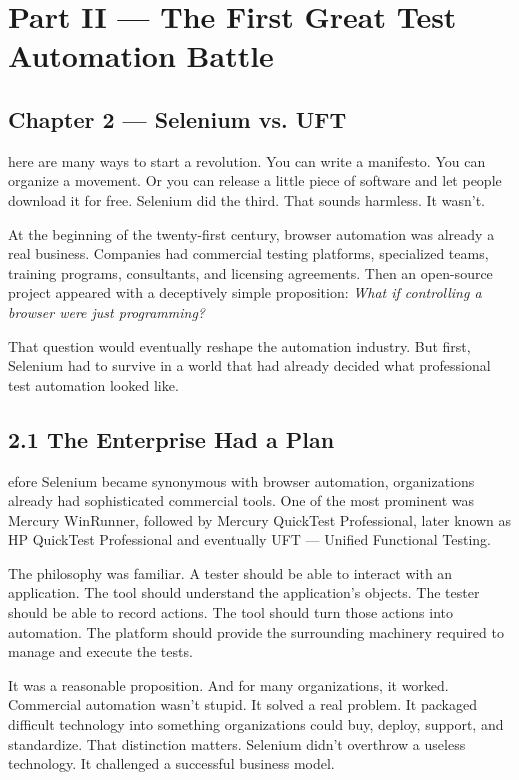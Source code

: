 \documentclass[11pt, a4paper, openany]{book}
\newcommand{\initialcap}[1]{{\fontfamily{lmss}\selectfont\huge\textbf{#1}}}
\begin{document}
\mainmatter

\chapter*{Part II --- The First Great Test Automation Battle}

\section*{Chapter 2 --- Selenium vs. UFT}

\noindent \initialcap{T}here are many ways to start a revolution. You can write a manifesto. You can organize a movement. Or you can release a little piece of software and let people download it for free. Selenium did the third. That sounds harmless. It wasn't.

At the beginning of the twenty-first century, browser automation was already a real business. Companies had commercial testing platforms, specialized teams, training programs, consultants, and licensing agreements. Then an open-source project appeared with a deceptively simple proposition: \textit{What if controlling a browser were just programming?}

That question would eventually reshape the automation industry. But first, Selenium had to survive in a world that had already decided what professional test automation looked like.

\section{2.1 The Enterprise Had a Plan}
\noindent \initialcap{B}efore Selenium became synonymous with browser automation, organizations already had sophisticated commercial tools. One of the most prominent was Mercury WinRunner, followed by Mercury QuickTest Professional, later known as HP QuickTest Professional and eventually UFT --- Unified Functional Testing.

The philosophy was familiar. A tester should be able to interact with an application. The tool should understand the application's objects. The tester should be able to record actions. The tool should turn those actions into automation. The platform should provide the surrounding machinery required to manage and execute the tests.

It was a reasonable proposition. And for many organizations, it worked. Commercial automation wasn't stupid. It solved a real problem. It packaged difficult technology into something organizations could buy, deploy, support, and standardize. That distinction matters. Selenium didn't overthrow a useless technology. It challenged a successful business model.
\end{document}

